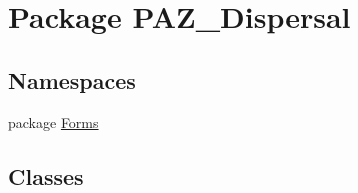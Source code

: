 \hypertarget{namespace_p_a_z___dispersal}{\section{Package P\-A\-Z\-\_\-\-Dispersal}
\label{namespace_p_a_z___dispersal}
}
\subsection*{Namespaces}
\begin{DoxyCompactItemize}
\item 
package \hyperlink{namespace_p_a_z___dispersal_1_1_forms}{Forms}
\end{DoxyCompactItemize}
\subsection*{Classes}
